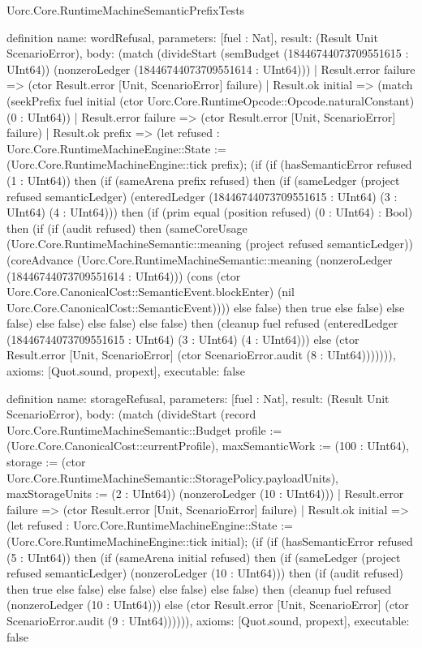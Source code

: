 \begin{lexlean}{Uorc.Core.RuntimeMachineSemanticPrefixTests}
\begin{semanticmodule}
definition{
  name: wordRefusal,
  parameters: [fuel : Nat],
  result: (Result Unit ScenarioError),
  body: (match (divideStart (semBudget (18446744073709551615 : UInt64)) (nonzeroLedger (18446744073709551614 : UInt64)))
    | Result.error failure => (ctor Result.error [Unit, ScenarioError] failure)
    | Result.ok initial => (match (seekPrefix fuel initial (ctor Uorc.Core.RuntimeOpcode::Opcode.naturalConstant) (0 : UInt64))
      | Result.error failure => (ctor Result.error [Unit, ScenarioError] failure)
      | Result.ok prefix => (let refused : Uorc.Core.RuntimeMachineEngine::State := (Uorc.Core.RuntimeMachineEngine::tick prefix); (if (if (hasSemanticError refused (1 : UInt64)) then (if (sameArena prefix refused) then (if (sameLedger (project refused semanticLedger) (enteredLedger (18446744073709551615 : UInt64) (3 : UInt64) (4 : UInt64))) then (if (prim equal (position refused) (0 : UInt64) : Bool) then (if (if (audit refused) then (sameCoreUsage (Uorc.Core.RuntimeMachineSemantic::meaning (project refused semanticLedger)) (coreAdvance (Uorc.Core.RuntimeMachineSemantic::meaning (nonzeroLedger (18446744073709551614 : UInt64))) (cons (ctor Uorc.Core.CanonicalCost::SemanticEvent.blockEnter) (nil Uorc.Core.CanonicalCost::SemanticEvent)))) else false) then true else false) else false) else false) else false) else false) then (cleanup fuel refused (enteredLedger (18446744073709551615 : UInt64) (3 : UInt64) (4 : UInt64))) else (ctor Result.error [Unit, ScenarioError] (ctor ScenarioError.audit (8 : UInt64))))))),
  axioms: [Quot.sound, propext],
  executable: false
}

definition{
  name: storageRefusal,
  parameters: [fuel : Nat],
  result: (Result Unit ScenarioError),
  body: (match (divideStart (record Uorc.Core.RuntimeMachineSemantic::Budget {profile := (Uorc.Core.CanonicalCost::currentProfile), maxSemanticWork := (100 : UInt64), storage := (ctor Uorc.Core.RuntimeMachineSemantic::StoragePolicy.payloadUnits), maxStorageUnits := (2 : UInt64)}) (nonzeroLedger (10 : UInt64)))
    | Result.error failure => (ctor Result.error [Unit, ScenarioError] failure)
    | Result.ok initial => (let refused : Uorc.Core.RuntimeMachineEngine::State := (Uorc.Core.RuntimeMachineEngine::tick initial); (if (if (hasSemanticError refused (5 : UInt64)) then (if (sameArena initial refused) then (if (sameLedger (project refused semanticLedger) (nonzeroLedger (10 : UInt64))) then (if (audit refused) then true else false) else false) else false) else false) then (cleanup fuel refused (nonzeroLedger (10 : UInt64))) else (ctor Result.error [Unit, ScenarioError] (ctor ScenarioError.audit (9 : UInt64)))))),
  axioms: [Quot.sound, propext],
  executable: false
}


\end{semanticmodule}
\end{lexlean}
